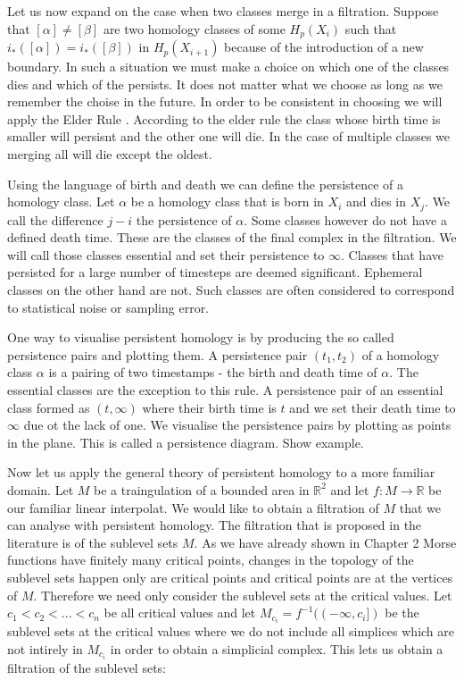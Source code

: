 Let us now expand on the case when two classes merge in a filtration. Suppose that $[\alpha] \ne [\beta]$ are two homology classes of some $H_p(X_i)$ such that $i_*([\alpha]) = i_*([\beta])$ in $H_p(X_{i+1})$ because of the introduction of a new boundary. In such a situation we must make a choice on which one of the classes dies and which of the persists. It does not matter what we choose as long as we remember the choise in the future. In order to be consistent in choosing we will apply the Elder Rule \cite{comp-topo}. According to the elder rule the class whose birth time is smaller will persisnt and the other one will die. In the case of multiple classes we merging all will die except the oldest.

Using the language of birth and death we can define the persistence of a homology class. Let $\alpha$ be a homology class that is born in $X_i$ and dies in $X_j$. We call the difference $j - i$ the persistence of $\alpha$. Some classes however do not have a defined death time. These are the classes of the final complex in the filtration. We will call those classes essential and set their persistence to $\infty$. Classes that have persisted for a large number of timesteps are deemed significant. Ephemeral classes on the other hand are not. Such classes are often considered to correspond to statistical noise or sampling error.


One way to visualise persistent homology is by producing the so called persistence pairs and plotting them. A persistence pair $(t_1, t_2)$ of a homology class $\alpha$ is a pairing of two timestamps - the birth and death time of $\alpha$. The essential classes are the exception to this rule. A persistence pair of an essential class formed as $(t, \infty)$ where their birth time is $t$ and we set their death time to $\infty$ due ot the lack of one. We visualise the persistence pairs by plotting as points in the plane. This is called a persistence diagram. Show example.


Now let us apply the general theory of persistent homology to a more familiar domain. Let $M$ be a traingulation of a bounded area in $\mathbb{R}^2$ and let $f: M \to \mathbb{R}$ be our familiar linear interpolat. We would like to obtain a filtration of $M$ that we can analyse with persistent homology. The filtration that is proposed in the literature \cite{comp-topo} is of the sublevel sets $M$. As we have already shown in Chapter 2 Morse functions have finitely many critical points, changes in the topology of the sublevel sets happen only are critical points and critical points are at the vertices of $M$. Therefore we need only consider the sublevel sets at the critical values. Let $c_1 < c_2 < ... < c_n$ be all critical values and let $M_{c_i} = f^{-1}((-\infty, c_i])$ be the sublevel sets at the critical values where we do not include all simplices which are not intirely in $M_{c_i}$ in order to obtain a simplicial complex. This lets us obtain a filtration of the sublevel sets:


